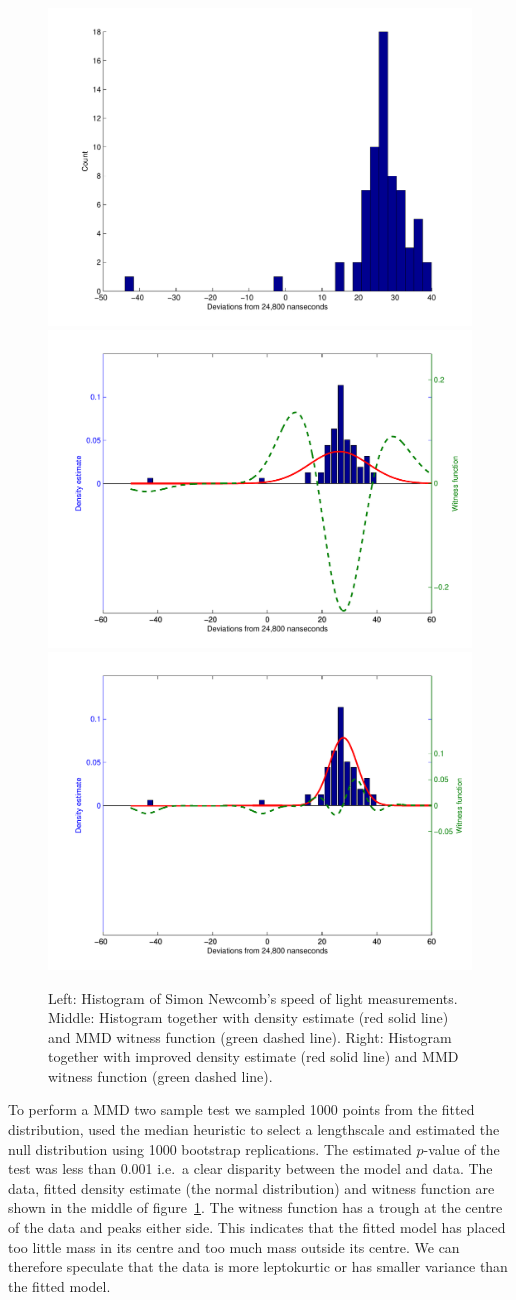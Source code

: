 \documentclass{article} %
\def\ie{i.e.\ }
\begin{document}
\begin{figure}[ht]
\centering
\includegraphics[width=0.32\columnwidth]{figures/newcomb_hist}
\includegraphics[width=0.32\columnwidth]{figures/newcomb_witness_1}
\includegraphics[width=0.32\columnwidth]{figures/newcomb_witness_2}
\caption{
Left: Histogram of Simon Newcomb's speed of light measurements.
Middle: Histogram together with density estimate (red solid line) and MMD witness function (green dashed line).
Right: Histogram together with improved density estimate (red solid line) and MMD witness function (green dashed line).
}
\label{fig:newcomb}
\end{figure}

To perform a MMD two sample test we sampled 1000 points from the fitted distribution, used the median heuristic to select a lengthscale and estimated the null distribution using 1000 bootstrap replications.
The estimated $p$-value of the test was less than 0.001 \ie a clear disparity between the model and data.
The data, fitted density estimate (the normal distribution) and witness function are shown in the middle of figure~\ref{fig:newcomb}.
The witness function has a trough at the centre of the data and peaks either side.
This indicates that the fitted model has placed too little mass in its centre and too much mass outside its centre.
We can therefore speculate that the data is more leptokurtic or has smaller variance than the fitted model.
\end{document}
